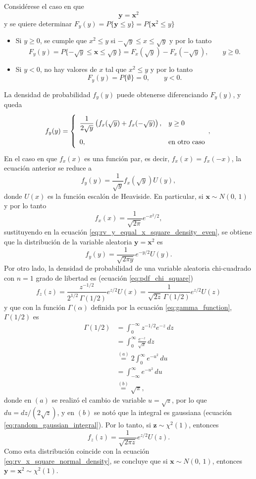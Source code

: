 \documentclass[a4paper]{report}
\newcommand{\x}{\mathbf{x}}
\newcommand{\y}{\mathbf{y}}
\newcommand{\z}{\mathbf{z}}
\begin{document}
Considérese el caso en que
\[
 \y=\x^2
\]
y se quiere determinar \(F_y(y)=P\{\y\leq y\}=P\{\x^2\leq y\}\)
\begin{itemize}
 \item Si \(y\geq 0\), se cumple que \(x^2\leq y\) si \(-\sqrt{y}\leq x\leq \sqrt{y}\) y por lo tanto
 \[
  F_y(y)=P\{-\sqrt{y}\leq \x\leq \sqrt{y}\}=F_x(\sqrt{y})-F_x(-\sqrt{y}), \qquad y\geq0.
 \]
 \item Si \(y<0\), no hay valores de \(x\) tal que \(x^2\leq y\) y por lo tanto
 \[
  F_y(y)=P\{\emptyset\}=0,\qquad y<0.
 \]
\end{itemize}
La densidad de probabilidad \(f_y(y)\) puede obtenerse diferenciando \(F_y(y)\), y queda
\[
\def\arraystretch{2.0}
 f_y(y)=
 \left\{\begin{array}{ll}
  \dfrac{1}{2\sqrt{y}}\left(f_x(\sqrt{y})+f_x(-\sqrt{y})\right), & y\geq 0\\
  0, & \textrm{en otro caso}
 \end{array}, \right.
\]
En el caso en que \(f_x(x)\) es una función par, es decir, \(f_x(x)=f_x(-x)\), la ecuación anterior se reduce a
\begin{equation}\label{eq:rv_y_equal_x_square_density_even}
 f_y(y)=\frac{1}{\sqrt{y}}f_x(\sqrt{y})U(y),
\end{equation}
donde \(U(x)\) es la función escalón de Heaviside. En particular, si \(\x\sim N(0,\,1)\) y por lo  tanto
\[
 f_x(x)=\frac{1}{\sqrt{2\pi}}e^{-x^2/2},
\]
sustituyendo en la ecuación \ref{eq:rv_y_equal_x_square_density_even}, se obtiene que la distribución de la variable aleatoria \(\y=\x^2\) es
\begin{equation}\label{eq:rv_x_square_normal_density}
 f_y(y)=\frac{1}{\sqrt{2\pi y}}e^{-y/2}U(y).
\end{equation}
Por otro lado, la densidad de probabilidad de una variable aleatoria chi-cuadrado con \(n=1\) grado de libertad es (ecuación \ref{eq:pdf_chi_square})
\[
 f_z(z)=\frac{z^{-1/2}}{2^{1/2}\,\Gamma(1/2)} e^{z/2}U(x)=\frac{1}{\sqrt{2z}\,\Gamma(1/2)} e^{z/2}U(z)
\]
y que con la función \(\Gamma(\alpha)\) definida por la ecuación \ref{eq:gamma_function}, \(\Gamma(1/2)\) es  
\begin{align*}
 \Gamma(1/2)&=\int_{0}^{-\infty}z^{-1/2}e^{-z}\,dz\\
    &=\int_{0}^{\infty}\frac{e^{-z}}{\sqrt{x}}\,dz\\
    &\overset{(a)}{=}2\int_{0}^{\infty}e^{-u^2}\,du\\
    &=\int_{-\infty}^{\infty}e^{-u^2}\,du\\
    &\overset{(b)}{=}\sqrt{\pi},
\end{align*}
donde en \((a)\) se realizó el cambio de variable \(u=\sqrt{z}\), por lo que \(du=dz/(2\sqrt{z})\), y en \((b)\) se notó que la integral es gaussiana (ecuación \ref{eq:random_gaussian_integral}). Por lo tanto, si \(\z\sim\chi^2(1)\), entonces
\[
 f_z(z)=\frac{1}{\sqrt{2\pi z}} e^{z/2}U(z).
\]
Como esta distribución coincide con la ecuación \ref{eq:rv_x_square_normal_density}, se concluye que si \(\x\sim N(0,\,1)\), entonces \(\y=\x^2\sim\chi^2(1)\).
\end{document}
